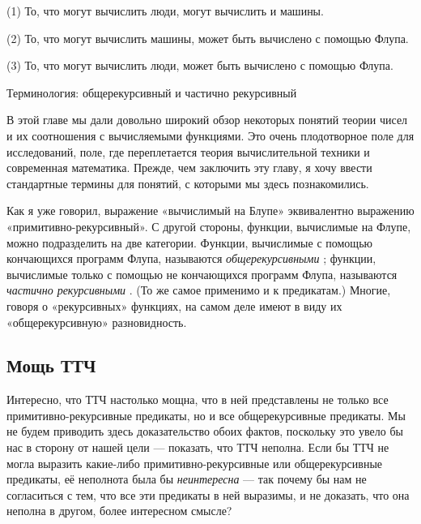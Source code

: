 \documentclass[../main.tex]{subfiles}
\begin{document}
(1) То, что могут вычислить люди, могут вычислить и машины.

(2) То, что могут вычислить машины, может быть вычислено с помощью Флупа.

(3) То, что могут вычислить люди, может быть вычислено с помощью Флупа.

Терминология: общерекурсивный и частично рекурсивный

В этой главе мы дали довольно широкий обзор некоторых понятий теории чисел и их соотношения с вычисляемыми функциями. Это очень плодотворное поле для исследований, поле, где переплетается теория вычислительной техники и современная математика. Прежде, чем заключить эту главу, я хочу ввести стандартные термины для понятий, с которыми мы здесь познакомились.

Как я уже говорил, выражение «вычислимый на Блупе» эквивалентно выражению «примитивно-рекурсивный». С другой стороны, функции, вычислимые на Флупе, можно подразделить на две категории. Функции, вычислимые с помощью кончающихся программ Флупа, называются \emph{общерекурсивными} ; функции, вычислимые только с помощью не кончающихся программ Флупа, называются \emph{частично рекурсивными} . (То же самое применимо и к предикатам.) Многие, говоря о «рекурсивных» функциях, на самом деле имеют в виду их «общерекурсивную» разновидность.


\subsection{Мощь ТТЧ}

Интересно, что ТТЧ настолько мощна, что в ней представлены не только все примитивно-рекурсивные предикаты, но и все общерекурсивные предикаты. Мы не будем приводить здесь доказательство обоих фактов, поскольку это увело бы нас в сторону от нашей цели --- показать, что ТТЧ неполна. Если бы ТТЧ не могла выразить какие-либо примитивно-рекурсивные или общерекурсивные предикаты, её неполнота была бы \emph{неинтересна} --- так почему бы нам не согласиться с тем, что все эти предикаты в ней выразимы, и не доказать, что она неполна в другом, более интересном смысле?
\end{document}
